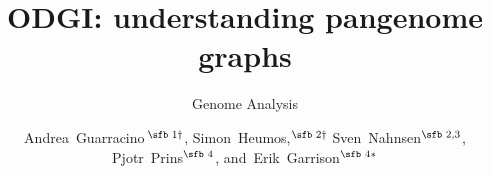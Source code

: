 \documentclass{bioinfo}
\begin{document}

\subtitle{Genome Analysis}

\title[ODGI: understanding pangenome graphs]{ODGI: understanding pangenome graphs}
\author[Guarracino, Heumos \textit{et~al}.]{
Andrea~Guarracino\,$^{\text{\sfb 1} \dagger}$,
Simon~Heumos,$^{\text{\sfb 2} \dagger}$
Sven~Nahnsen$^{\text{\sfb 2,3}}$, \\
Pjotr~Prins$^{\text{\sfb 4}}$,
and~Erik~Garrison$^{\text{\sfb 4}*}$
}

\address{
$^{\text{\sf 1}}$Genomics Research Centre, Human Technopole, Milan, Italy \\
$^{\text{\sf 2}}$Quantitative Biology Center (QBiC), University of T\"ubingen, T\"ubingen, Germany, 72076 \\
$^{\text{\sf 3}}$Biomedical Data Science, Dept. of Computer Science, University of T\"ubingen, T\"ubingen, Germany, 72076 \\
$^{\text{\sf 4}}$University of Tennessee Health Science Center, Memphis, TN, USA
}




\end{document}
